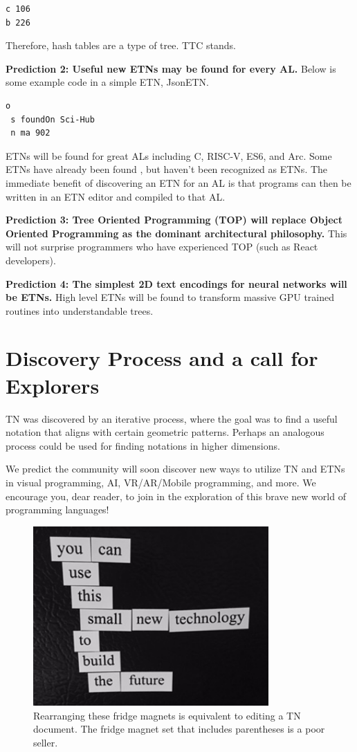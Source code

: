\documentclass[journal]{IEEEtran}
\begin{document}
\begin{lstlisting}
c 106
b 226
\end{lstlisting}

Therefore, hash tables are a type of tree. TTC stands.

\textbf{Prediction 2: Useful new ETNs may be found for every AL.} Below is some example code in a simple ETN, JsonETN.

\begin{lstlisting}
o
 s foundOn Sci-Hub
 n ma 902
\end{lstlisting}

ETNs will be found for great ALs including C, RISC-V, ES6, and Arc. Some ETNs have already been found \cite{Roughan}, but haven't been recognized as ETNs. The immediate benefit of discovering an ETN for an AL is that programs can then be written in an ETN editor and compiled to that AL.

\textbf{Prediction 3: Tree Oriented Programming (TOP) will replace Object Oriented Programming as the dominant architectural philosophy.} This will not surprise programmers who have experienced TOP (such as React developers).

\textbf{Prediction 4: The simplest 2D text encodings for neural networks will be ETNs.} High level ETNs will be found to transform massive GPU trained routines into understandable trees.

\section{Discovery Process and a call for Explorers}

TN was discovered by an iterative process, where the goal was to find a useful notation that aligns with certain geometric patterns. Perhaps an analogous process could be used for finding notations in higher dimensions.

We predict the community will soon discover new ways to utilize TN and ETNs in visual programming, AI, VR/AR/Mobile programming, and more. We encourage you, dear reader, to join in the exploration of this brave new world of programming languages!

\begin{figure}[ht!]
\centering
\includegraphics[width=90mm]{tree.jpg}
\caption{Rearranging these fridge magnets is equivalent to editing a TN document. The fridge magnet set that includes parentheses is a poor seller.}
\end{figure}
\end{document}
